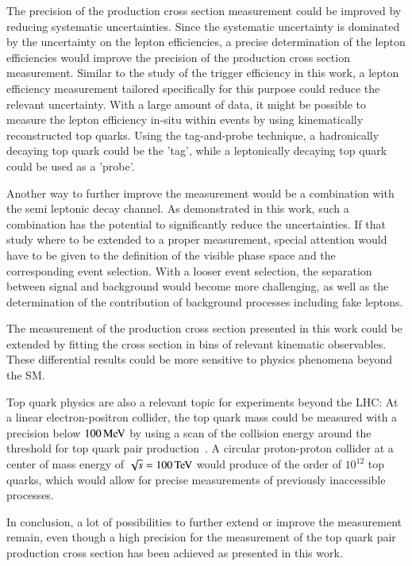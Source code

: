 The precision of the \ttbar production cross section measurement could be improved by reducing systematic uncertainties.
Since the systematic uncertainty is dominated by the uncertainty on the lepton efficiencies, a precise determination of the lepton efficiencies would improve the precision of the \ttbar production cross section measurement.
Similar to the study of the trigger efficiency in this work, a lepton efficiency measurement tailored specifically for this purpose could reduce the relevant uncertainty.
With a large amount of data, it might be possible to measure the lepton efficiency in-situ within \ttbar events by using kinematically reconstructed top quarks. Using the tag-and-probe technique, a hadronically 
decaying top quark could be the 'tag', while a leptonically decaying top quark could be used as a 'probe'.

Another way to further improve the measurement would be a combination with the semi leptonic \ttbar decay channel. As demonstrated in this work, such a combination has the potential to significantly reduce the uncertainties.
If that study where to be extended to a proper measurement, special attention would have to be given to the definition of the visible phase space and the corresponding event selection. With a looser event selection, the separation between
signal and background would become more challenging, as well as the determination of the contribution of background processes including fake leptons.

The measurement of the \ttbar production cross section presented in this work could be extended by fitting the cross section in bins of relevant kinematic observables.
These differential results could be more sensitive to physics phenomena beyond the SM.

Top quark physics are also a relevant topic for experiments beyond the LHC: At a linear electron-positron collider, the top quark mass could be measured with a precision below $100 \,\text{Me\hspace{-.08em}V}$ by using a scan
of the collision energy around the threshold for top quark pair production~\cite{Seidel2013}. A circular proton-proton collider at a center of mass energy of $\sqrt{s}=100 \,\text{Te\hspace{-.08em}V}$ would produce of the order
of $10^{12}$ top quarks, which would allow for precise measurements of previously inaccessible processes.

In conclusion, a lot of possibilities to further extend or improve the measurement remain, even though a high precision for the measurement of the top quark pair production cross section has been achieved as presented in this work.

